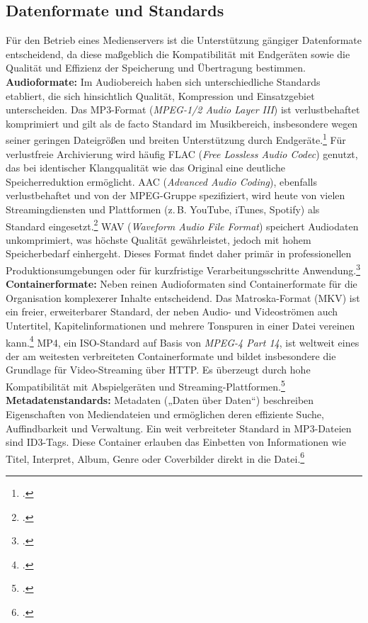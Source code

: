 \documentclass[12pt,a4paper]{report}
\begin{document}
  \subsection{Datenformate und Standards}  
  Für den Betrieb eines Medienservers ist die Unterstützung gängiger Datenformate entscheidend, 
  da diese maßgeblich die Kompatibilität mit Endgeräten sowie die Qualität und Effizienz der Speicherung und Übertragung bestimmen.  
  \\
  \newline
  \textbf{Audioformate:}  
  Im Audiobereich haben sich unterschiedliche Standards etabliert, die sich hinsichtlich Qualität, Kompression und Einsatzgebiet unterscheiden.  
  Das \ac{MP3}-Format (\emph{MPEG-1/2 Audio Layer III}) ist verlustbehaftet komprimiert und gilt als de facto Standard im Musikbereich, 
  insbesondere wegen seiner geringen Dateigrößen und breiten Unterstützung durch Endgeräte.\footcite[Vgl.][S.~702~f.]{tanenbaum_computernetworks}  
  Für verlustfreie Archivierung wird häufig \ac{FLAC} (\emph{Free Lossless Audio Codec}) genutzt, 
  das bei identischer Klangqualität wie das Original eine deutliche Speicherreduktion ermöglicht.  
  \ac{AAC} (\emph{Advanced Audio Coding}), ebenfalls verlustbehaftet und von der MPEG-Gruppe spezifiziert, 
  wird heute von vielen Streamingdiensten und Plattformen (z.\,B. YouTube, iTunes, Spotify) als Standard eingesetzt.\footcite[Vgl.][]{openlearn_aac} 
  \ac{WAV} (\emph{Waveform Audio File Format}) speichert Audiodaten unkomprimiert, was höchste Qualität gewährleistet, jedoch mit hohem Speicherbedarf einhergeht.
  Dieses Format findet daher primär in professionellen Produktionsumgebungen oder für kurzfristige Verarbeitungsschritte Anwendung.\footcite[Vgl.][]{wikipedia_wav}  
  \\
  \newline
  \textbf{Containerformate:}  
  Neben reinen Audioformaten sind Containerformate für die Organisation komplexerer Inhalte entscheidend.  
  Das Matroska-Format (\ac{MKV}) ist ein freier, erweiterbarer Standard, der neben Audio- und Videoströmen auch Untertitel, 
  Kapitelinformationen und mehrere Tonspuren in einer Datei vereinen kann.\footcite[Vgl.][siehe 1. Introduction]{rfc9559}  
  \ac{MP4}, ein ISO-Standard auf Basis von \emph{MPEG-4 Part 14}, ist weltweit eines der am weitesten verbreiteten Containerformate 
  und bildet insbesondere die Grundlage für Video-Streaming über \ac{HTTP}. 
  Es überzeugt durch hohe Kompatibilität mit Abspielgeräten und Streaming-Plattformen.\footcite[Vgl.][S.~702~f.]{tanenbaum_computernetworks}
  \\
  \newline
  \textbf{Metadatenstandards:}
  Metadaten („Daten über Daten“) beschreiben Eigenschaften von Mediendateien und ermöglichen deren effiziente Suche, Auffindbarkeit und Verwaltung. 
  Ein weit verbreiteter Standard in \ac{MP3}-Dateien sind \ac{ID3}-Tags. 
  Diese Container erlauben das Einbetten von Informationen wie Titel, Interpret, Album, Genre oder Coverbilder direkt in die Datei.\footcite[Vgl.][siehe 4. Declared ID3v2 frames]{id3org_spec}
\end{document}
